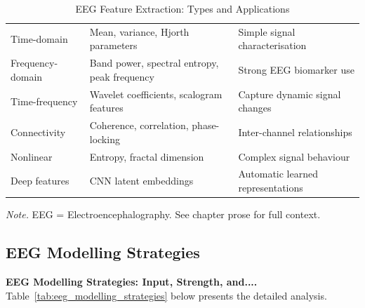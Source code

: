 {\tablestripes\tablefontsize

\begin{xltabular}{\textwidth}{@{} >{\raggedright\arraybackslash}p{2cm} L L @{}}
\caption[EEG Feature Extraction]{EEG Feature Extraction: Types and Applications}\label{tab:eeg_feature_types} \\
\toprule
{} &  &  \\
\midrule
\endfirsthead
\endhead
\bottomrule
\endlastfoot
Time-domain & Mean, variance, Hjorth parameters & Simple signal characterisation \\
Frequency-domain & Band power, spectral entropy, peak frequency & Strong EEG biomarker use \\
Time-frequency & Wavelet coefficients, scalogram features & Capture dynamic signal changes \\
Connectivity & Coherence, correlation, phase-locking & Inter-channel relationships \\
Nonlinear & Entropy, fractal dimension & Complex signal behaviour \\
Deep features & CNN latent embeddings & Automatic learned representations \\
\end{xltabular}}
\vspace{0.3em}\noindent\textit{Note.} EEG = Electroencephalography. See chapter prose for full context.

\subsection{EEG Modelling Strategies}\label{sec:appendix_ch3_eeg_modelling_strategies}

\noindent\textbf{EEG Modelling Strategies: Input, Strength, and....} Table~\ref{tab:eeg_modelling_strategies} below presents the detailed analysis.

